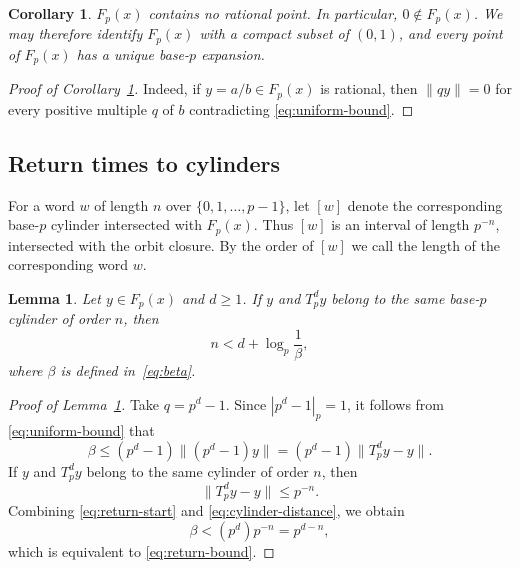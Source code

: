 \documentclass[11pt]{article}
\newtheorem{lemma}[theorem]{Lemma}
\newtheorem{corollary}[theorem]{Corollary}
\theoremstyle{remark}
\newcommand{\Fp}{F_p}
\begin{document}
\begin{corollary}\label{cor_no_rat_points} $\Fp(x)$ contains no
rational point. In particular, $0\notin\Fp(x)$.  We may therefore
identify $\Fp(x)$ with a compact subset of $(0,1)$, and every point
of $\Fp(x)$ has a unique base-$p$ expansion.
\end{corollary}
\begin{proof}[Proof of Corollary~\ref{cor_no_rat_points}]
Indeed, if $y=a/b \in \Fp(x)$ is rational, then $\|qy\|=0$ for
every positive multiple $q$ of $b$ contradicting
\eqref{eq:uniform-bound}.
\end{proof}

\subsection{Return times to cylinders}\label{s4}

For a word $w$ of length $n$ over $\{0,1,\ldots,p-1\}$, let $[w]$
denote the corresponding base-$p$ cylinder intersected with
$\Fp(x)$.  Thus $[w]$ is an interval of length $p^{-n}$, intersected
with the orbit closure. By the order of $[w]$ we call the length of
the corresponding word $w$.

\begin{lemma}\label{lemma_return_times}
Let $y\in\Fp(x)$ and $d\geq1$.  If $y$ and $T_p^d y$ belong to the
same base-$p$ cylinder of order $n$, then
\begin{equation}  \label{eq:return-bound}
    n<d+\log_p\frac{1}{\beta},
\end{equation}
where $\beta$ is defined in~\eqref{eq:beta}.
\end{lemma}

\begin{proof}[Proof of Lemma~\ref{lemma_return_times}]
Take $q=p^d-1$.  Since $|p^d-1|_p=1$, it follows from
\eqref{eq:uniform-bound} that
\begin{equation} \label{eq:return-start}
    \beta
    \leq(p^d-1)\bigl\|(p^d-1)y\bigr\|
    =(p^d-1)\|T_p^dy-y\|.
\end{equation}
If $y$ and $T_p^dy$ belong to the same cylinder of order $n$, then
\begin{equation} \label{eq:cylinder-distance}
    \|T_p^dy-y\|\leq p^{-n}.
\end{equation}
Combining \eqref{eq:return-start} and \eqref{eq:cylinder-distance},
we obtain
\begin{equation}   \label{eq:return-comparison}
    \beta<(p^d)p^{-n}=p^{d-n},
\end{equation}
which is equivalent to \eqref{eq:return-bound}.
\end{proof}
\end{document}
